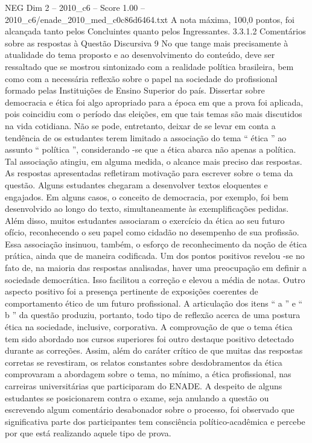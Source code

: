 \begin{textsample}{NEG Dim 2 – 2010\_c6 – Score 1.00 – 2010\_c6/enade\_2010\_med\_c0c86d6464.txt}
A nota máxima, 100,0 pontos, foi alcançada tanto pelos Concluintes quanto pelos Ingressantes. 3.3.1.2 Comentários sobre as respostas à Questão Discursiva 9 No que tange mais precisamente à atualidade do tema proposto e ao desenvolvimento do conteúdo, deve ser ressaltado que se mostrou sintonizado com a realidade política brasileira, bem como com a necessária reflexão sobre o papel na sociedade do profissional formado pelas Instituições de Ensino Superior do país.
Dissertar sobre democracia e ética foi algo apropriado para a época em que a prova foi aplicada, pois coincidiu com o período das eleições, em que tais temas são mais discutidos na vida cotidiana.
Não se pode, entretanto, deixar de se levar em conta a tendência de os estudantes terem limitado a associação do tema “ ética ” ao assunto “ política ”, considerando -se que a ética abarca não apenas a política.
Tal associação atingiu, em alguma medida, o alcance mais preciso das respostas.
As respostas apresentadas refletiram motivação para escrever sobre o tema da questão.
Alguns estudantes chegaram a desenvolver textos eloquentes e engajados.
Em alguns casos, o conceito de democracia, por exemplo, foi bem desenvolvido ao longo do texto, simultaneamente às exemplificações pedidas.
Além disso, muitos estudantes associaram o exercício da ética ao seu futuro ofício, reconhecendo o seu papel como cidadão no desempenho de sua profissão.
Essa associação insinuou, também, o esforço de reconhecimento da noção de ética prática, ainda que de maneira codificada.
Um dos pontos positivos revelou -se no fato de, na maioria das respostas analisadas, haver uma preocupação em definir a sociedade democrática.
Isso facilitou a correção e elevou a média de notas.
Outro aspecto positivo foi a presença pertinente de exposições coerentes de comportamento ético de um futuro profissional.
A articulação dos itens “ a ” e “ b ” da questão produziu, portanto, todo tipo de reflexão acerca de uma postura ética na sociedade, inclusive, corporativa.
A comprovação de que o tema ética tem sido abordado nos cursos superiores foi outro destaque positivo detectado durante as correções.
Assim, além do caráter crítico de que muitas das respostas corretas se revestiram, os relatos constantes sobre desdobramentos da ética comprovaram a abordagem sobre o tema, no mínimo, a ética profissional, nas carreiras universitárias que participaram do ENADE.
A despeito de alguns estudantes se posicionarem contra o exame, seja anulando a questão ou escrevendo algum comentário desabonador sobre o processo, foi observado que significativa parte dos participantes tem consciência político-acadêmica e percebe por que está realizando aquele tipo de prova.

\end{textsample}
